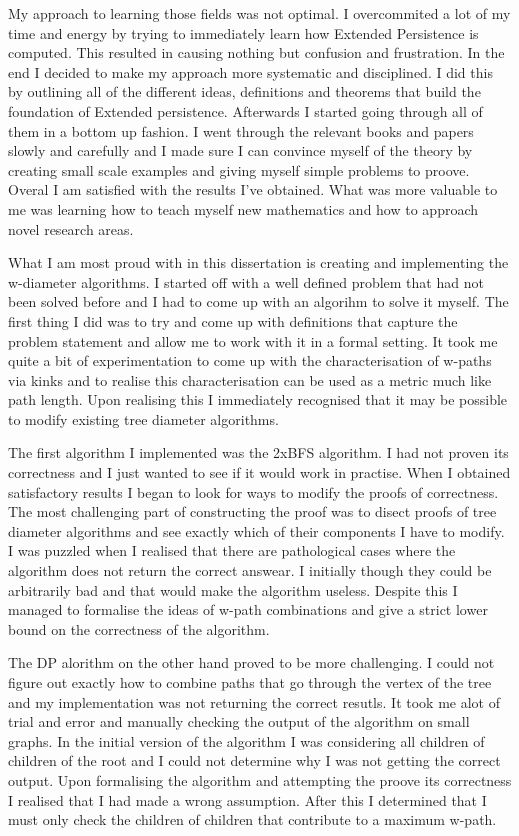 My approach to learning those fields was not optimal. I overcommited a lot of my time and energy by trying to immediately learn how Extended Persistence is computed. This resulted in causing nothing but confusion and frustration. In the end I decided to make my approach more systematic and disciplined. I did this by outlining all of the different ideas, definitions and theorems that build the foundation of Extended persistence. Afterwards I started going through all of them in a bottom up fashion. I went through the relevant books and papers slowly and carefully and I made sure I can convince myself of the theory by creating small scale examples and giving myself simple problems to proove. Overal I am satisfied with the results I've obtained. What was more valuable to me was learning how to teach myself new mathematics and how to approach novel research areas.

What I am most proud with in this dissertation is creating and implementing the w-diameter algorithms. I started off with a well defined problem that had not been solved before and I had to come up with an algorihm to solve it myself. The first thing I did was to try and come up with definitions that capture the problem statement and allow me to work with it in a formal setting. It took me quite a bit of experimentation to come up with the characterisation of w-paths via kinks and to realise this characterisation can be used as a metric much like path length. Upon realising this I immediately recognised that it may be possible to modify existing tree diameter algorithms.

The first algorithm I implemented was the 2xBFS algorithm. I had not proven its correctness and I just wanted to see if it would work in practise. When I obtained satisfactory results I began to look for ways to modify the proofs of correctness. The most challenging part of constructing the proof was to disect proofs of tree diameter algorithms and see exactly which of their components I have to modify. I was puzzled when I realised that there are pathological cases where the algorithm does not return the correct answear. I initially though they could be arbitrarily bad and that would make the algorithm useless. Despite this I managed to formalise the ideas of w-path combinations and give a strict lower bound on the correctness of the algorithm.

The DP alorithm on the other hand proved to be more challenging. I could not figure out exactly how to combine paths that go through the vertex  of the tree and my implementation was not returning the correct resutls. It took me alot of trial and error and manually checking the output of the algorithm on small graphs. In the initial version of the algorithm I was considering all children of children of the root and I could not determine why I was not getting the correct output. Upon formalising the algorithm and attempting the proove its correctness I realised that I had made a wrong assumption. After this I determined that I must only check the children of children that contribute to a maximum w-path.


